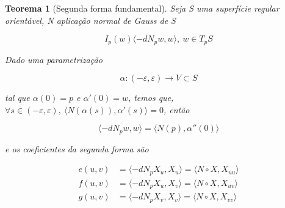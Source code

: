 \documentclass[12pt]{article}
\newtheorem{theorem}{Teorema}
\begin{document}
\begin{theorem}[Segunda forma fundamental]
Seja S uma superfície regular orientável, N aplicação normal de Gauss de S

\begin{equation*}
    I_p(w) \langle - dN_p w, w \rangle,\ w \in T_p S
\end{equation*}

Dado uma parametrização

\begin{equation*}
    \alpha: (- \varepsilon, \varepsilon) \to V \subset S
\end{equation*}

tal que $\alpha(0) = p$ e $\alpha'(0) = w$, temos que, $\forall s \in (- \varepsilon, \varepsilon),\ \langle N(\alpha(s)), \alpha'(s) \rangle = 0$, então

\begin{equation*}
    \langle -d N_p w, w \rangle = \langle N(p), \alpha''(0) \rangle
\end{equation*}

e os coeficientes da segunda forma são

\begin{align*}
    e(u, v) &= \langle - dN_p X_u, X_u \rangle = \langle N \circ X, X_{uu} \rangle \\
    f(u, v) &= \langle - dN_p X_u, X_v \rangle = \langle N \circ X, X_{uv} \rangle \\
    g(u, v) &= \langle - dN_p X_v, X_v \rangle = \langle N \circ X, X_{vv} \rangle
\end{align*}
\end{theorem}
\end{document}
